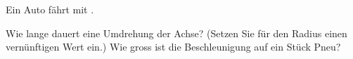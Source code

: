 Ein Auto fährt mit \vaO.
\begin{abcliste}
\abc Wie lange dauert eine Umdrehung der Achse? (Setzen Sie für den Radius einen vernünftigen Wert ein.)
\abc Wie gross ist die Beschleunigung auf ein Stück Pneu?
\end{abcliste}
